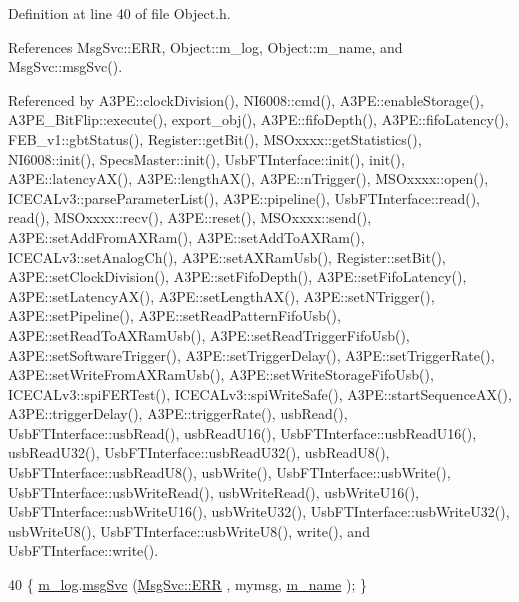 Definition at line 40 of file Object.\+h.



References Msg\+Svc\+::\+E\+RR, Object\+::m\+\_\+log, Object\+::m\+\_\+name, and Msg\+Svc\+::msg\+Svc().



Referenced by A3\+P\+E\+::clock\+Division(), N\+I6008\+::cmd(), A3\+P\+E\+::enable\+Storage(), A3\+P\+E\+\_\+\+Bit\+Flip\+::execute(), export\+\_\+obj(), A3\+P\+E\+::fifo\+Depth(), A3\+P\+E\+::fifo\+Latency(), F\+E\+B\+\_\+v1\+::gbt\+Status(), Register\+::get\+Bit(), M\+S\+Oxxxx\+::get\+Statistics(), N\+I6008\+::init(), Specs\+Master\+::init(), Usb\+F\+T\+Interface\+::init(), init(), A3\+P\+E\+::latency\+A\+X(), A3\+P\+E\+::length\+A\+X(), A3\+P\+E\+::n\+Trigger(), M\+S\+Oxxxx\+::open(), I\+C\+E\+C\+A\+Lv3\+::parse\+Parameter\+List(), A3\+P\+E\+::pipeline(), Usb\+F\+T\+Interface\+::read(), read(), M\+S\+Oxxxx\+::recv(), A3\+P\+E\+::reset(), M\+S\+Oxxxx\+::send(), A3\+P\+E\+::set\+Add\+From\+A\+X\+Ram(), A3\+P\+E\+::set\+Add\+To\+A\+X\+Ram(), I\+C\+E\+C\+A\+Lv3\+::set\+Analog\+Ch(), A3\+P\+E\+::set\+A\+X\+Ram\+Usb(), Register\+::set\+Bit(), A3\+P\+E\+::set\+Clock\+Division(), A3\+P\+E\+::set\+Fifo\+Depth(), A3\+P\+E\+::set\+Fifo\+Latency(), A3\+P\+E\+::set\+Latency\+A\+X(), A3\+P\+E\+::set\+Length\+A\+X(), A3\+P\+E\+::set\+N\+Trigger(), A3\+P\+E\+::set\+Pipeline(), A3\+P\+E\+::set\+Read\+Pattern\+Fifo\+Usb(), A3\+P\+E\+::set\+Read\+To\+A\+X\+Ram\+Usb(), A3\+P\+E\+::set\+Read\+Trigger\+Fifo\+Usb(), A3\+P\+E\+::set\+Software\+Trigger(), A3\+P\+E\+::set\+Trigger\+Delay(), A3\+P\+E\+::set\+Trigger\+Rate(), A3\+P\+E\+::set\+Write\+From\+A\+X\+Ram\+Usb(), A3\+P\+E\+::set\+Write\+Storage\+Fifo\+Usb(), I\+C\+E\+C\+A\+Lv3\+::spi\+F\+E\+R\+Test(), I\+C\+E\+C\+A\+Lv3\+::spi\+Write\+Safe(), A3\+P\+E\+::start\+Sequence\+A\+X(), A3\+P\+E\+::trigger\+Delay(), A3\+P\+E\+::trigger\+Rate(), usb\+Read(), Usb\+F\+T\+Interface\+::usb\+Read(), usb\+Read\+U16(), Usb\+F\+T\+Interface\+::usb\+Read\+U16(), usb\+Read\+U32(), Usb\+F\+T\+Interface\+::usb\+Read\+U32(), usb\+Read\+U8(), Usb\+F\+T\+Interface\+::usb\+Read\+U8(), usb\+Write(), Usb\+F\+T\+Interface\+::usb\+Write(), Usb\+F\+T\+Interface\+::usb\+Write\+Read(), usb\+Write\+Read(), usb\+Write\+U16(), Usb\+F\+T\+Interface\+::usb\+Write\+U16(), usb\+Write\+U32(), Usb\+F\+T\+Interface\+::usb\+Write\+U32(), usb\+Write\+U8(), Usb\+F\+T\+Interface\+::usb\+Write\+U8(), write(), and Usb\+F\+T\+Interface\+::write().


\begin{DoxyCode}
40 \{ \hyperlink{classObject_a0d269813dd7ac1f24bc143031e2963f2}{m\_log}.\hyperlink{classMsgSvc_ad25f18047920cc59a314e5098259711c}{msgSvc} (\hyperlink{classMsgSvc_ae671eb7301996cd049d2da8a65925926a35a9d7166e9896af4ec8fb33bf5f1772}{MsgSvc::ERR}     , mymsg, \hyperlink{classObject_a8b83c95c705d2c3ba0d081fe1710f48d}{m\_name} ); \}
\end{DoxyCode}
\mbox{\label{classObject_ad7f6c457733082efa2f9ff5f5c8e119a}} 
